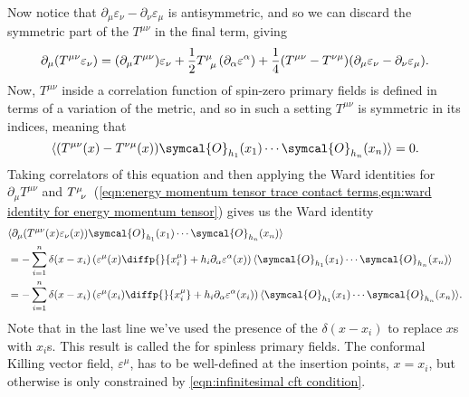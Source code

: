 \documentclass[fleqn]{NotesClass}
\newcommand{\quantumField}[1]{\symcal{#1}}
\DeclarePairedDelimiter{\correlator}{\langle}{\rangle}
\begin{document}
    Now notice that \(\partial_\mu \varepsilon_\nu - \partial_\nu \varepsilon_\mu\) is antisymmetric, and so we can discard the symmetric part of the \(T^{\mu\nu}\) in the final term, giving
    \begin{equation}
        \partial_\mu (T^{\mu\nu}\varepsilon_\nu) = (\partial_\mu T^{\mu\nu})\varepsilon_\nu + \frac{1}{2}\tensor{T}{^\mu_\mu}(\partial_\alpha \varepsilon^\alpha) + \frac{1}{4}(T^{\mu\nu} - T^{\nu\mu})(\partial_\mu \varepsilon_\nu - \partial_\nu \varepsilon_\mu).
    \end{equation}
    Now, \(T^{\mu\nu}\) inside a correlation function of spin-zero primary fields is defined in terms of a variation of the metric, and so in such a setting \(T^{\mu\nu}\) is symmetric in its indices, meaning that
    \begin{equation}
        \label{eqn:energy momentum tensor symmetric in correlators}
        \correlator{(T^{\mu\nu}(x) - T^{\nu\mu}(x)) \quantumField{O}_{h_1}(x_1) \dotsm \quantumField{O}_{h_n}(x_n)} = 0.
    \end{equation}
    Taking correlators of this equation and then applying the Ward identities for \(\partial_\mu T^{\mu\nu}\) and \(\tensor{T}{^\mu_\nu}\) (\cref{eqn:energy momentum tensor trace contact terms,eqn:ward identity for energy momentum tensor}) gives us the Ward identity
    \begin{align}
        \label{eqn:conformal ward identity}
        &\correlator{\partial_\mu(T^{\mu\nu}(x)\varepsilon_\nu(x)) \quantumField{O}_{h_1}(x_1) \dotsm \quantumField{O}_{h_n}(x_n)}\\
        &= -\sum_{i=1}^n \delta(x - x_i) \left( \varepsilon^\mu(x) \diffp{}{x_i^\mu} + h_i \partial_\alpha \varepsilon^\alpha(x) \right) \correlator{\quantumField{O}_{h_1}(x_1) \dotsm \quantumField{O}_{h_n}(x_n)}\\
        &= -\sum_{i=1}^n \delta(x - x_i)\left( \varepsilon^\mu(x_i) \diffp{}{x_i^\mu} + h_i \partial_\alpha \varepsilon^\alpha(x_i) \right) \correlator{\quantumField{O}_{h_1}(x_1) \dotsm \quantumField{O}_{h_n}(x_n)}.
    \end{align}
    Note that in the last line we've used the presence of the \(\delta(x - x_i)\) to replace \(x\)s with \(x_i\)s.
    This result is called the  for spinless primary fields.
    The conformal Killing vector field, \(\varepsilon^\mu\), has to be well-defined at the insertion points, \(x = x_i\), but otherwise is only constrained by \cref{eqn:infinitesimal cft condition}.
    
\end{document}
